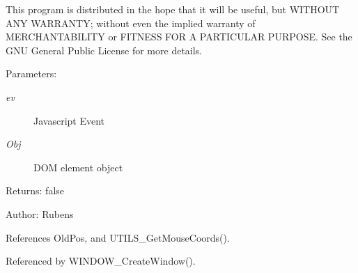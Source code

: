 This program is distributed in the hope that it will be useful, but WITHOUT ANY WARRANTY; without even the implied warranty of MERCHANTABILITY or FITNESS FOR A PARTICULAR PURPOSE. See the GNU General Public License for more details. \begin{Desc}
\item[Parameters:]
\begin{description}
\item[{\em ev}]Javascript Event \item[{\em Obj}]DOM element object \end{description}
\end{Desc}
\begin{Desc}
\item[Returns:]false \end{Desc}
\begin{Desc}
\item[Author:]Rubens \end{Desc}


References OldPos, and UTILS\_\-GetMouseCoords().

Referenced by WINDOW\_\-CreateWindow().